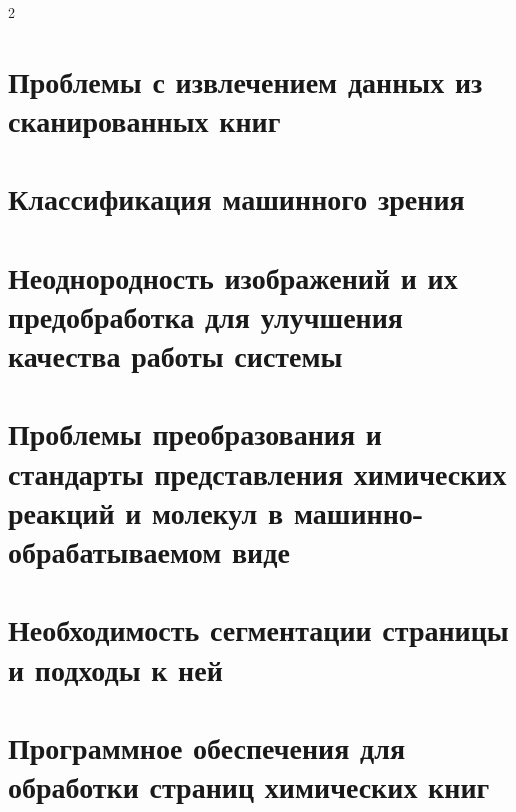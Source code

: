 \documentclass[11pt]{article}
\begin{document}
	


\begin{multicols}{2}	




\section{Проблемы с извлечением данных из сканированных книг}


\section{Классификация машинного зрения}


\section{Неоднородность изображений и их предобработка для улучшения качества работы системы}


\section{Проблемы преобразования и стандарты представления химических реакций и молекул в машинно-обрабатываемом виде}


\section{Необходимость сегментации страницы и подходы к ней}




\section{Программное обеспечения для обработки страниц химических книг}



\end{multicols}
\end{document}

